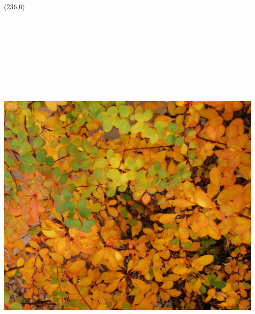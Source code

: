 \documentclass{article}
\begin{document}
\begin{textblock}{6.125}(236,0)
\noindent\includegraphics[angle=90,height=8.25in,width=9.881in]{../../Starting/Cover/FrontMain.jpg}
\end{textblock}
\end{document}
